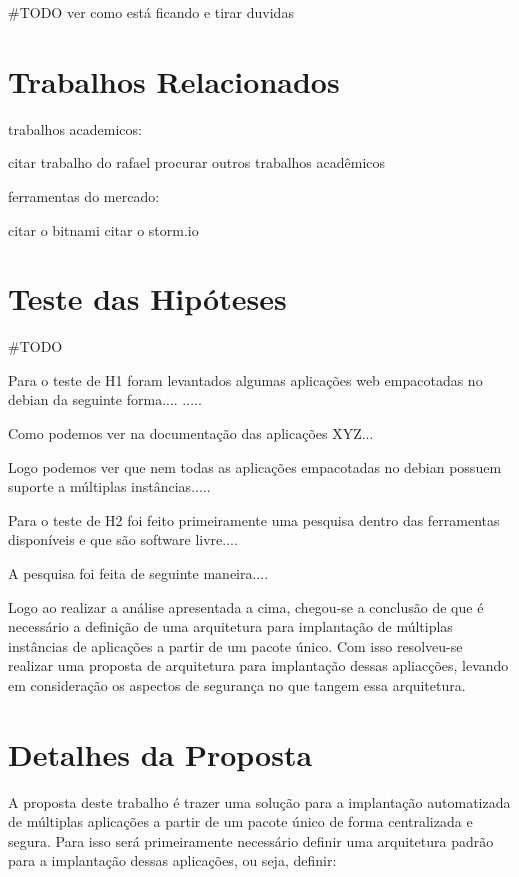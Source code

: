 #TODO ver como está ficando e tirar duvidas

\section{Trabalhos Relacionados}

trabalhos academicos:

citar trabalho do rafael
procurar outros trabalhos acadêmicos

ferramentas do mercado:

citar o bitnami
citar o storm.io

\section{Teste das Hipóteses}

#TODO

Para o teste de H1 foram levantados algumas aplicações web empacotadas no debian
da seguinte forma....  .....

Como podemos ver na documentação das aplicações XYZ...

Logo podemos ver que nem todas as aplicações empacotadas no debian possuem
suporte a múltiplas instâncias.....


Para o teste de H2 foi feito primeiramente uma pesquisa dentro das ferramentas
disponíveis e que são software livre....

A pesquisa foi feita de seguinte maneira....

Logo ao realizar a análise apresentada a cima, chegou-se a conclusão de que
é necessário a definição de uma arquitetura para implantação de múltiplas
instâncias de aplicações a partir de um pacote único. Com isso resolveu-se
realizar uma proposta de arquitetura para implantação dessas apliacções, levando
em consideração os aspectos de segurança no que tangem essa arquitetura.

\section{Detalhes da Proposta}

A proposta deste trabalho é trazer uma solução para a implantação automatizada
de múltiplas aplicações a partir de um pacote único de forma centralizada e segura.
Para isso será primeiramente necessário definir uma arquitetura padrão para a
implantação dessas aplicações, ou seja, definir:


